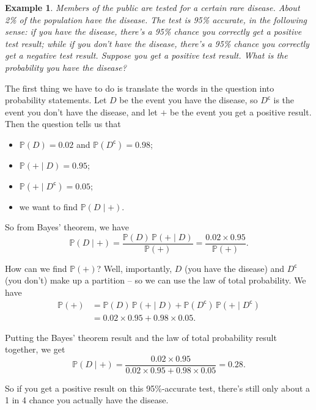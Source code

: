 \documentclass[
  a4paper,
]{book}
\providecommand{\tightlist}{%
  \setlength{\itemsep}{0pt}\setlength{\parskip}{0pt}}
\theoremstyle{definition}
\theoremstyle{definition}
\newtheorem{example}{Example}[chapter]
\theoremstyle{definition}
\theoremstyle{definition}
\theoremstyle{remark}
\begin{document}
\begin{example}
\emph{Members of the public are tested for a certain rare disease. About 2\% of the population have the disease. The test is 95\% accurate, in the following sense: if you have the disease, there's a 95\% chance you correctly get a positive test result; while if you don't have the disease, there's a 95\% chance you correctly get a negative test result. Suppose you get a positive test result. What is the probability you have the disease?}

The first thing we have to do is translate the words in the question into probability statements. Let \(D\) be the event you have the disease, so \(D^\mathsf{c}\) is the event you don't have the disease, and let \(+\) be the event you get a positive result. Then the question tells us that

\begin{itemize}
\tightlist
\item
  \(\mathbb P(D) = 0.02\) and \(\mathbb P(D^\mathsf{c}) = 0.98\);
\item
  \(\mathbb P({+} \mid D) = 0.95\);
\item
  \(\mathbb P({+}\mid D^\mathsf{c}) = 0.05\);
\item
  we want to find \(\mathbb P(D \mid {+})\).
\end{itemize}

So from Bayes' theorem, we have
\[  \mathbb P(D \mid {+}) = \frac{\mathbb P(D) \,\mathbb P({+} \mid D)}{\mathbb P(+)} = \frac{0.02 \times 0.95}{\mathbb P(+)} . \]

How can we find \(\mathbb P(+)\)? Well, importantly, \(D\) (you have the disease) and \(D^\mathsf{c}\) (you don't) make up a partition -- so we can use the law of total probability. We have
\begin{align*}
  \mathbb P(+) &= \mathbb P(D) \,\mathbb P({+} \mid D)+\mathbb P(D^\mathsf{c}) \,\mathbb P({+} \mid D^\mathsf{c}) \\
    &= 0.02 \times 0.95 + 0.98 \times 0.05 .
\end{align*}

Putting the Bayes' theorem result and the law of total probability result together, we get
\[ \mathbb P(D \mid {+}) = \frac{0.02 \times 0.95}{0.02 \times 0.95 + 0.98 \times 0.05} = 0.28 .\]

So if you get a positive result on this 95\%-accurate test, there's still only about a 1 in 4 chance you actually have the disease.
\end{example}
\end{document}

